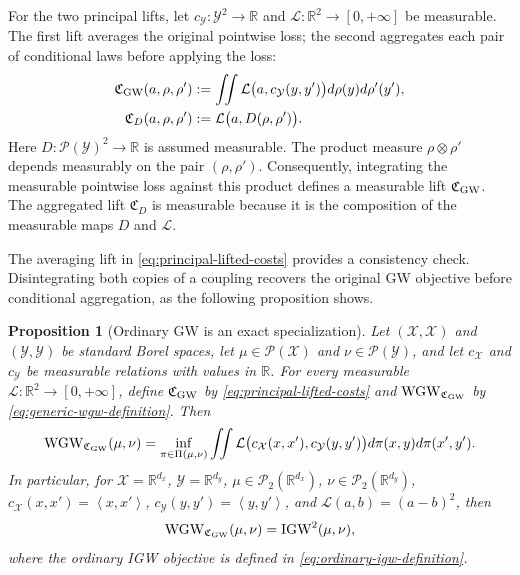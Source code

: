 \documentclass[11pt]{article}
\newcommand{\R}{\mathbb R}
\newcommand{\cP}{\mathcal P}
\newcommand{\ip}[2]{\left\langle #1,#2\right\rangle}
\newcommand{\IGW}{\mathrm{IGW}}
\newcommand{\WGW}{\mathrm{WGW}}
\theoremstyle{plain}
\newtheorem{proposition}[theorem]{Proposition}
\theoremstyle{definition}
\theoremstyle{remark}
\begin{document}
For the two principal lifts, let
$c_{\mathcal Y}:\mathcal Y^2\to\R$ and
$\mathcal L:\R^2\to[0,+\infty]$ be measurable. The first lift averages the
original pointwise loss;
the second aggregates each pair of conditional laws before applying the loss:
\begin{equation}\label{eq:principal-lifted-costs}
\begin{aligned}
 \mathfrak C_{\rm GW}(a,\rho,\rho')
   &:=\iint\mathcal L\big(a,c_{\mathcal Y}(y,y')\big)d\rho(y)d\rho'(y'),\\
 \mathfrak C_D(a,\rho,\rho')
   &:=\mathcal L\big(a,D(\rho,\rho')\big).
\end{aligned}
\end{equation}
Here $D:\cP(\mathcal Y)^2\to\R$ is assumed measurable. The product measure
$\rho\otimes\rho'$ depends measurably on the pair $(\rho,\rho')$. Consequently,
integrating the measurable pointwise loss against this product defines a measurable
lift $\mathfrak C_{\rm GW}$. The aggregated lift $\mathfrak C_D$ is measurable
because it is the composition of the measurable maps $D$ and $\mathcal L$.

The averaging lift in \eqref{eq:principal-lifted-costs} provides a consistency
check. Disintegrating both copies of a coupling recovers the original GW
objective before conditional aggregation, as the following proposition shows.

\begin{proposition}[Ordinary GW is an exact specialization]\label{prop:gw-specialization}
Let $(\mathcal X,\mathscr X)$ and $(\mathcal Y,\mathscr Y)$ be standard Borel
spaces, let $\mu\in\cP(\mathcal X)$ and $\nu\in\cP(\mathcal Y)$, and let
$c_{\mathcal X}$ and $c_{\mathcal Y}$ be measurable relations with values in $\R$. For
every measurable $\mathcal L:\R^2\to[0,+\infty]$, define
$\mathfrak C_{\rm GW}$ by \eqref{eq:principal-lifted-costs} and
$\WGW_{\mathfrak C_{\rm GW}}$ by \eqref{eq:generic-wgw-definition}. Then
\[
  \WGW_{\mathfrak C_{\rm GW}}(\mu,\nu)
  =\inf_{\pi\in\Pi(\mu,\nu)}
  \iint \mathcal L\big(c_{\mathcal X}(x,x'),c_{\mathcal Y}(y,y')\big)
  d\pi(x,y)d\pi(x',y').
\]
In particular, for $\mathcal X=\R^{d_x}$, $\mathcal Y=\R^{d_y}$,
$\mu\in\cP_2(\R^{d_x})$, $\nu\in\cP_2(\R^{d_y})$,
$c_{\mathcal X}(x,x')=\ip{x}{x'}$,
$c_{\mathcal Y}(y,y')=\ip{y}{y'}$, and
$\mathcal L(a,b)=(a-b)^2$, then
\[
 \WGW_{\mathfrak C_{\rm GW}}(\mu,\nu)=\IGW^2(\mu,\nu),
\]
where the ordinary IGW objective is defined in
\eqref{eq:ordinary-igw-definition}.
\end{proposition}
\end{document}
